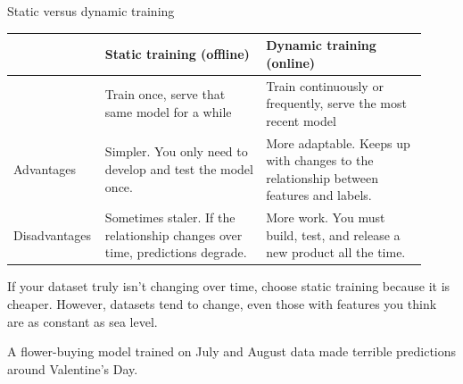 \begin{frame}{Static versus dynamic training}
  \begin{withmargin}
    \begin{tdmain}
      \footnotesize
      \begin{tabular}{@{}p{0.16\linewidth}p{0.38\linewidth}p{0.38\linewidth}@{}}
        \toprule
         & \textbf{Static training (offline)} & \textbf{Dynamic training (online)}\\
        \midrule
        & Train once, serve that same model for a while
        & Train continuously or frequently, serve the most recent model\\[0.4em]
        Advantages & Simpler. You only need to develop and test the model once.
        & More adaptable. Keeps up with changes to the relationship between
          features and labels.\\[0.4em]
        Disadvantages & Sometimes staler. If the relationship changes over time,
          predictions degrade.
        & More work. You must build, test, and release a new product all the
          time.\\
        \bottomrule
      \end{tabular}
    \end{tdmain}
    \begin{tdmargin}
      If your dataset truly isn't changing over time, choose static training
      because it is cheaper. However, datasets tend to change, even those with
      features you think are as constant as sea level.
      \par\medskip
       A flower-buying model trained on July and August data made
      terrible predictions around Valentine's Day.
    \end{tdmargin}
  \end{withmargin}
\end{frame}

